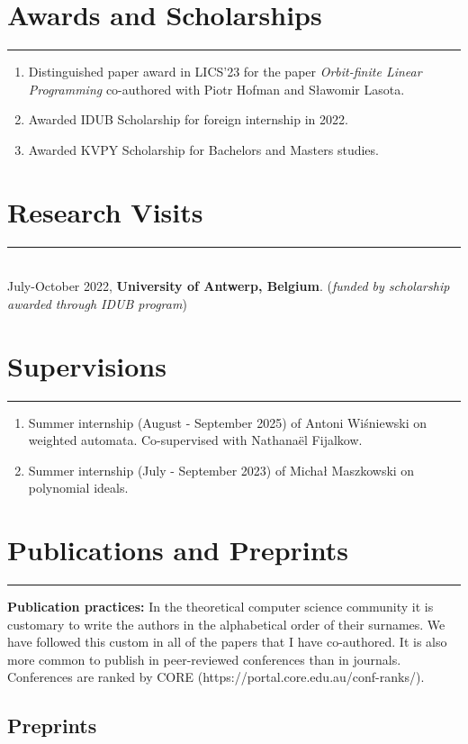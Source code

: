 \documentclass[11pt]{article}
\begin{document}
\section*{Awards and Scholarships}
\hrule
\smallskip
%
\begin{enumerate}
    \item[$\diamond$]
    Distinguished paper award in LICS'23 for the paper \emph{Orbit-finite Linear Programming} co-authored with Piotr Hofman and S\l awomir Lasota.

    \item[$\diamond$]
    Awarded IDUB Scholarship for foreign internship in 2022.
    
     \item[$\diamond$]
    Awarded KVPY Scholarship for Bachelors and Masters studies. 
\end{enumerate}

\section*{Research Visits}
\hrule
$ $\\
July-October 2022,
\textbf{University of Antwerp,
Belgium}.
(\emph{funded by scholarship awarded through IDUB program})
%
\section*{Supervisions}
\hrule
\smallskip
%
\begin{enumerate}
\item[$\diamond$]
Summer internship (August - September 2025) of Antoni Wi\'{s}niewski on weighted automata.
Co-supervised with Nathana\"{e}l Fijalkow.
\item[$\diamond$]
Summer internship (July - September 2023) of Micha\l{} Maszkowski on polynomial ideals.
\end{enumerate}
%
\section*{Publications and Preprints}
\hrule
\smallskip


\textbf{Publication practices:} 
In the theoretical computer science community it is customary to write the authors in the alphabetical order of their surnames. We have followed this custom in all of the papers that I have co-authored.
It is also more common to publish in peer-reviewed conferences than in journals.
Conferences are ranked by CORE (https://portal.core.edu.au/conf-ranks/).
\subsection*{Preprints}
%
\smallskip
\end{document}
